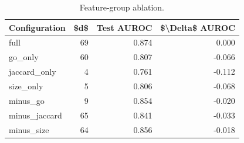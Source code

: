 \begin{table}[htbp]
\centering
\caption{Feature-group ablation.}
\label{tab:ablation_recomputed}
\begin{tabular}{lrrr}
\toprule
Configuration & \$d\$ & Test AUROC & \$\textbackslash Delta\$ AUROC \\
\midrule
full & 69 & 0.874 & 0.000 \\
go\_only & 60 & 0.807 & -0.066 \\
jaccard\_only & 4 & 0.761 & -0.112 \\
size\_only & 5 & 0.806 & -0.068 \\
minus\_go & 9 & 0.854 & -0.020 \\
minus\_jaccard & 65 & 0.841 & -0.033 \\
minus\_size & 64 & 0.856 & -0.018 \\
\bottomrule
\end{tabular}

\end{table}
